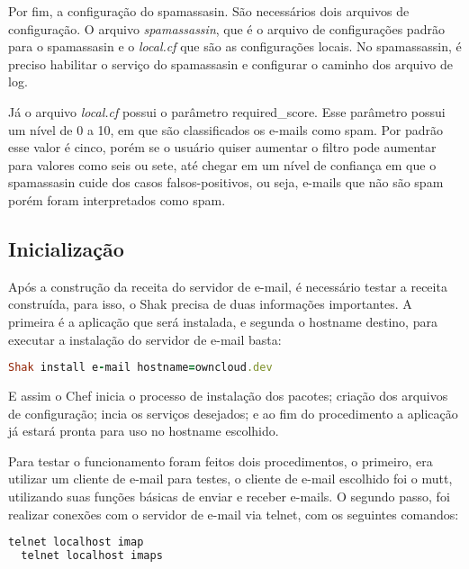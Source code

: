 Por fim, a configuração do spamassasin. São necessários dois arquivos de configuração.
O arquivo \textit{spamassassin}, que é o arquivo de configurações padrão para o spamassasin e o
\textit{local.cf} que são as configurações locais. No spamassassin, é preciso habilitar 
o serviço do spamassasin e configurar o caminho dos arquivo de log.

Já o arquivo \textit{local.cf} possui o parâmetro required\_score. Esse parâmetro 
possui um nível de 0 a 10, em que 
são classificados os e-mails como spam. Por padrão esse valor é cinco, porém se 
o usuário quiser aumentar o filtro pode aumentar para valores como seis ou sete, 
até chegar em um nível de confiança em que o spamassasin cuide dos casos falsos-positivos, 
ou seja, e-mails que não são spam porém foram interpretados como spam.

\subsection{Inicialização}

Após a construção da receita do servidor de e-mail, é necessário testar a receita construída,
para isso, o Shak precisa de duas informações importantes. A primeira é a aplicação
que será instalada, e segunda o hostname destino, para executar a instalação
do servidor de e-mail basta:

\begin{lstlisting}[language=Ruby,label=dice_index,caption={Exemplo de execução de instalação do servidor de e-mailcom shak}]
Shak install e-mail hostname=owncloud.dev
\end{lstlisting}


E assim o Chef inicia o processo de instalação dos pacotes; criação dos arquivos
de configuração; incia os serviços desejados; e ao fim do procedimento a aplicação
já estará pronta para uso no hostname escolhido.

Para testar o funcionamento foram feitos dois procedimentos, o primeiro, era utilizar
um cliente de e-mail para testes, o cliente de e-mail escolhido foi o mutt, utilizando
suas funções básicas de enviar e receber e-mails. O segundo passo, foi realizar conexões
com o servidor de e-mail via telnet, com os seguintes comandos:

\begin{lstlisting}[language=Ruby,label=dice_index,caption={Exemplo de teste de conexão telnet no servidor imap}]
  telnet localhost imap
  telnet localhost imaps
\end{lstlisting}

